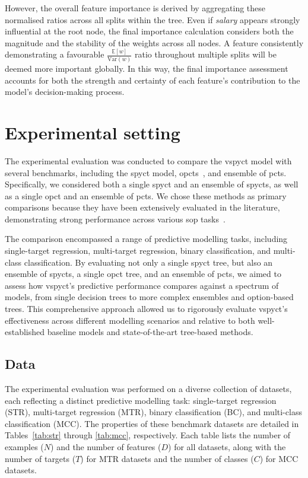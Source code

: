 \documentclass[3p,review,authoryear]{elsarticle}
\begin{document}
However, the overall feature importance is derived by aggregating these normalised ratios across all splits within the tree.
Even if \textit{salary} appears strongly influential at the root node, the final importance calculation considers both the magnitude and the stability of the weights across all nodes.
A feature consistently demonstrating a favourable \(\frac{\mathbb{E}[w]}{\text{Var}(w)}\) ratio throughout multiple splits will be deemed more important globally.
In this way, the final importance assessment accounts for both the strength and certainty of each feature’s contribution to the model’s decision-making process.


\section{Experimental setting}

The experimental evaluation was conducted to compare the \gls{vspyct} model with several benchmarks, including the \gls{spyct} model, \glspl{opct}~\citep{Stepisnik_2020}, and ensemble of \glspl{pct}.
Specifically, we considered both a single \gls{spyct} and an ensemble of \glspl{spyct}, as well as a single \gls{opct} and an ensemble of \glspl{pct}.
We chose these methods as primary comparisons because they have been extensively evaluated in the literature, demonstrating strong performance across various \gls{sop} tasks~\citep{Andonovikj_2024, Stepi_nik_2021}.

The comparison encompassed a range of predictive modelling tasks, including single-target regression, multi-target regression, binary classification, and multi-class classification.
By evaluating not only a single \gls{spyct} tree, but also an ensemble of \glspl{spyct}, a single \gls{opct} tree, and an ensemble of \glspl{pct}, we aimed to assess how \gls{vspyct}'s predictive performance compares against a spectrum of models, from single decision trees to more complex ensembles and option-based trees.
This comprehensive approach allowed us to rigorously evaluate \gls{vspyct}'s effectiveness across different modelling scenarios and relative to both well-established baseline models and state-of-the-art tree-based methods.


\subsection{Data}

The experimental evaluation was performed on a diverse collection of datasets, each reflecting a distinct predictive modelling task: single-target regression (STR), multi-target regression (MTR), binary classification (BC), and multi-class classification (MCC).
The properties of these benchmark datasets are detailed in Tables~\ref{tab:str} through \ref{tab:mcc}, respectively.
Each table lists the number of examples (\(N\)) and the number of features (\(D\)) for all datasets, along with the number of targets (\(T\)) for MTR datasets and the number of classes (\(C\)) for MCC datasets.
\end{document}
